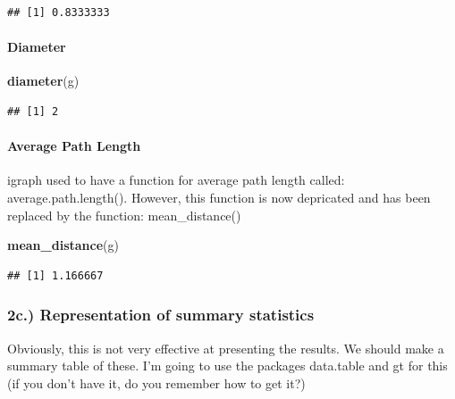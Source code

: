 \documentclass[
]{article}
\newenvironment{Shaded}{\begin{snugshade}}{\end{snugshade}}
\newcommand{\FunctionTok}[1]{\textcolor[rgb]{0.13,0.29,0.53}{\textbf{#1}}}
\newcommand{\NormalTok}[1]{#1}
\begin{document}
\begin{verbatim}
## [1] 0.8333333
\end{verbatim}

\paragraph{Diameter}\label{diameter}

\begin{Shaded}
\begin{Highlighting}[]
\FunctionTok{diameter}\NormalTok{(g)}
\end{Highlighting}
\end{Shaded}

\begin{verbatim}
## [1] 2
\end{verbatim}

\paragraph{Average Path Length}\label{average-path-length}

igraph used to have a function for average path length called:
average.path.length(). However, this function is now depricated and has
been replaced by the function: mean\_distance()

\begin{Shaded}
\begin{Highlighting}[]
\FunctionTok{mean\_distance}\NormalTok{(g)}
\end{Highlighting}
\end{Shaded}

\begin{verbatim}
## [1] 1.166667
\end{verbatim}

\subsubsection{2c.) Representation of summary
statistics}\label{c.-representation-of-summary-statistics}

Obviously, this is not very effective at presenting the results. We
should make a summary table of these. I'm going to use the packages
data.table and gt for this (if you don't have it, do you remember how to
get it?)
\end{document}
